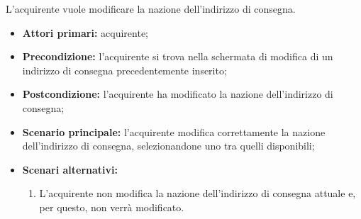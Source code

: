 \label{modifica-indirizzo-consegna.nazione}

L'acquirente vuole modificare la nazione dell'indirizzo di consegna.
\begin{itemize}
    \item \textbf{Attori primari:} acquirente;
    \item \textbf{Precondizione:} l'acquirente si trova nella schermata di modifica di un indirizzo di consegna precedentemente inserito;
    \item \textbf{Postcondizione:} l'acquirente ha modificato la nazione dell'indirizzo di consegna;
    \item \textbf{Scenario principale:} l'acquirente modifica correttamente la nazione dell'indirizzo di consegna, selezionandone uno tra quelli disponibili;
    \item \textbf{Scenari alternativi:}
    \begin{enumerate}[label=\lett]
        \item L'acquirente non modifica la nazione dell'indirizzo di consegna attuale e, per questo, non verrà modificato.
    \end{enumerate}
\end{itemize}

\label{modifica-indirizzo-consegna.comune}

